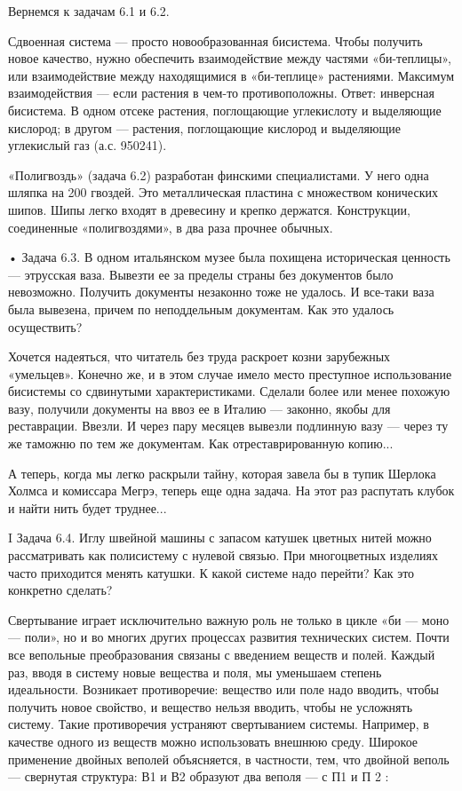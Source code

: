 Вернемся к задачам 6.1 и 6.2.

Сдвоенная система — просто  новообразованная бисистема. Чтобы получить
новое   качество,  нужно   обеспечить  взаимодействие   между  частями
«би-теплицы»,  или взаимодействие  между  находящимися в  «би-теплице»
растениями.  Максимум   взаимодействия  —   если  растения   в  чем-то
противоположны. Ответ:  инверсная бисистема. В одном  отсеке растения,
поглощающие углекислоту  и выделяющие  кислород; в другом  — растения,
поглощающие кислород и выделяющие углекислый газ (а.с. 950241).

«Полигвоздь» (задача  6.2) разработан  финскими специалистами.  У него
одна шляпка  на 200 гвоздей.  Это металлическая пластина  с множеством
конических шипов.  Шипы легко  входят в  древесину и  крепко держатся.
Конструкции, соединенные «полигвоздями», в два раза прочнее обычных.

• Задача  6.3. В  одном итальянском  музее была  похищена историческая
ценность — этрусская ваза. Вывезти ее за пределы страны без документов
было  невозможно.  Получить документы  незаконно  тоже  не удалось.  И
все-таки ваза  была вывезена,  причем по неподдельным  документам. Как
это удалось осуществить?

Хочется надеяться,  что читатель  без труда раскроет  козни зарубежных
«умельцев».  Конечно  же,  и  в этом  случае  имело  место  преступное
использование бисистемы со  сдвинутыми характеристиками. Сделали более
или  менее похожую  вазу, получили  документы на  ввоз ее  в Италию  —
законно, якобы для  реставрации. Ввезли. И через  пару месяцев вывезли
подлинную  вазу —  через  ту  же таможню  по  тем  же документам.  Как
отреставрированную копию...

А теперь,  когда мы легко  раскрыли тайну,  которая завела бы  в тупик
Шерлока Холмса и комиссара Мегрэ, теперь  еще одна задача. На этот раз
распутать клубок и найти нить будет труднее...

I  Задача 6.4.  Иглу швейной  машины с  запасом катушек  цветных нитей
можно рассматривать как полисистему с нулевой связью. При многоцветных
изделиях  часто  приходится  менять  катушки.  К  какой  системе  надо
перейти? Как это конкретно сделать?


Свертывание играет исключительно  важную роль не только в  цикле «би —
моно —  поли», но  и во многих  других процессах  развития технических
систем. Почти все вепольные преобразования связаны с введением веществ
и  полей. Каждый  раз,  вводя  в систему  новые  вещества  и поля,  мы
уменьшаем  степень идеальности.  Возникает противоречие:  вещество или
поле надо  вводить, чтобы получить  новое свойство, и  вещество нельзя
вводить,  чтобы не  усложнять  систему.  Такие противоречия  устраняют
свертыванием  системы. Например,  в качестве  одного из  веществ можно
использовать  внешнюю   среду.  Широкое  применение   двойных  веполей
объясняется,  в  частности,  тем,   что  двойной  веполь  —  свернутая
структура: В1 и В2 образуют два веполя — с П1 и П 2 :


